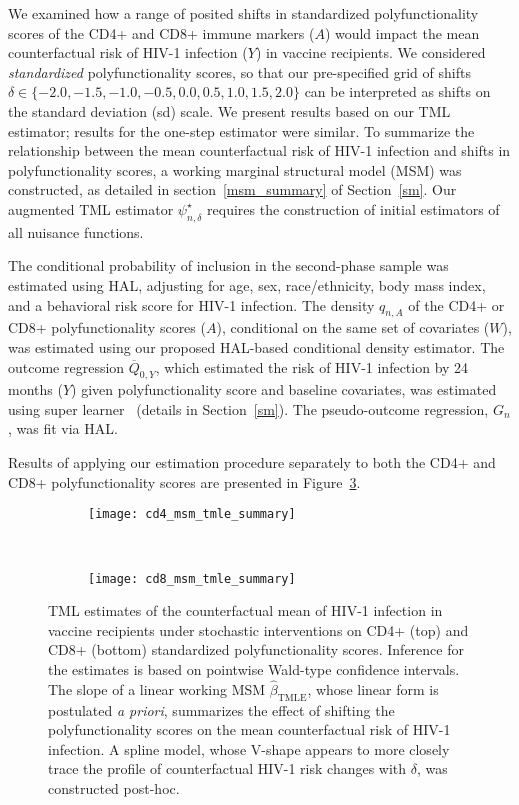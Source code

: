We examined how a range of posited shifts in standardized polyfunctionality
scores of the CD4+ and CD8+ immune markers ($A$) would impact the mean
counterfactual risk of HIV-1 infection ($Y$) in vaccine recipients. We
considered \textit{standardized} polyfunctionality scores, so that our
pre-specified grid of shifts $\delta \in \{-2.0, -1.5, -1.0, -0.5, \allowbreak
0.0, 0.5, 1.0, 1.5, 2.0\}$ can be interpreted as shifts on the standard
deviation (sd) scale. We present results based on our TML estimator; results for
the one-step estimator were similar. To summarize the relationship between the
mean counterfactual risk of HIV-1 infection and shifts in polyfunctionality
scores, a working marginal structural model (MSM) was constructed, as detailed
in section~\ref{msm_summary} of Section~\ref{sm}. Our
augmented TML estimator $\psi_{n,\delta}^{\star}$ requires the construction of
initial estimators of all nuisance functions.

The conditional probability of inclusion in the second-phase sample was
estimated using HAL, adjusting for age, sex, race/ethnicity, body mass index,
and a behavioral risk score for HIV-1 infection. The density $q_{n,A}$ of the
CD4+ or CD8+ polyfunctionality scores ($A$), conditional on the same set of
covariates ($W$), was estimated using our proposed HAL-based conditional density
estimator. The outcome regression $\overline{Q}_{0,Y}$, which estimated the risk
of HIV-1 infection by 24 months ($Y$) given polyfunctionality score and baseline
covariates, was estimated using super learner~\citep{vdl2007super} (details in
Section~\ref{sm}). The pseudo-outcome regression, $G_n$, was
fit via HAL.

Results of applying our estimation procedure separately to both the CD4+ and
CD8+ polyfunctionality scores are presented in
Figure~\ref{fig:hvtn505_tmle_msm}.

\begin{figure}[H]
  \begin{subfigure}{0.9\textwidth}
  \centering
  \texttt{[image: cd4\_msm\_tmle\_summary]}
  \label{fig:cd4_tmle_msm}
  \end{subfigure}\\[0.5cm]
  \begin{subfigure}{0.9\textwidth}
  \centering
  \texttt{[image: cd8\_msm\_tmle\_summary]}
  \label{fig:cd8_tmle_msm}
  \end{subfigure}
  \caption{TML estimates of the counterfactual mean of HIV-1 infection in
    vaccine recipients under stochastic interventions on CD4+ (top) and CD8+
    (bottom) standardized polyfunctionality scores. Inference for the estimates
    is based on pointwise Wald-type confidence intervals. The slope of a linear
    working MSM $\hat{\beta}_{\text{TMLE}}$, whose linear form is postulated
    \textit{a priori}, summarizes the effect of shifting the polyfunctionality
    scores on the mean counterfactual risk of HIV-1 infection. A spline model,
    whose V-shape appears to more closely trace the profile of counterfactual
    HIV-1 risk changes with $\delta$, was constructed post-hoc.}
  \label{fig:hvtn505_tmle_msm}
\end{figure}

